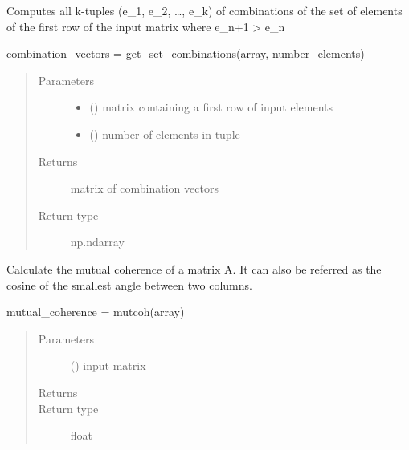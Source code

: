 \documentclass[letterpaper,10pt,english,openany,oneside]{sphinxmanual}
\begin{document}
\begin{fulllineitems}
\label{\detokenize{pygpc:pygpc.misc.get_all_combinations}}
Computes all k-tuples (e\_1, e\_2, …, e\_k) of combinations of the set of elements of the first row of the
input matrix where e\_n+1 \textgreater{} e\_n

combination\_vectors = get\_set\_combinations(array, number\_elements)
\begin{quote}\begin{description}
\item[{Parameters}] \leavevmode\begin{itemize}
\item {} 
 () \textendash{} matrix containing a first row of input elements

\item {} 
 () \textendash{} number of elements in tuple

\end{itemize}

\item[{Returns}] \leavevmode
{} \textendash{} matrix of combination vectors

\item[{Return type}] \leavevmode
np.ndarray

\end{description}\end{quote}

\end{fulllineitems}


\begin{fulllineitems}
\label{\detokenize{pygpc:pygpc.misc.mutcoh}}
Calculate the mutual coherence of a matrix A. It can also be referred as the cosine
of the smallest angle between two columns.

mutual\_coherence = mutcoh(array)
\begin{quote}\begin{description}
\item[{Parameters}] \leavevmode
{} () \textendash{} input matrix

\item[{Returns}] \leavevmode
{}

\item[{Return type}] \leavevmode
float

\end{description}\end{quote}

\end{fulllineitems}
\end{document}
